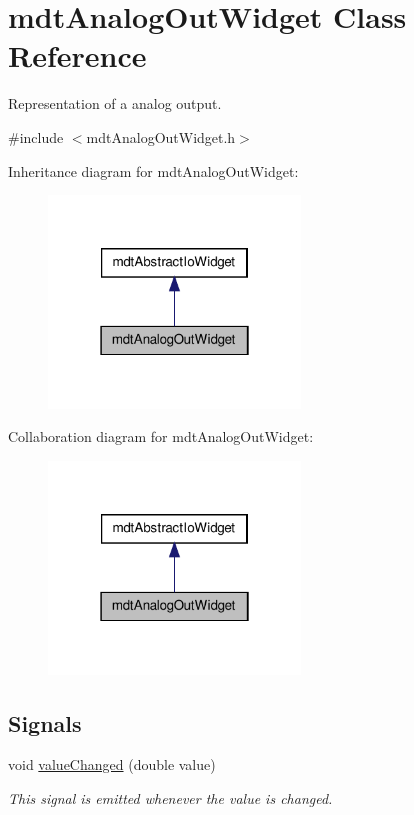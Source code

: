 \hypertarget{classmdt_analog_out_widget}{
\section{mdtAnalogOutWidget Class Reference}
\label{classmdt_analog_out_widget}
}


Representation of a analog output.  




{\ttfamily \#include $<$mdtAnalogOutWidget.h$>$}



Inheritance diagram for mdtAnalogOutWidget:
\nopagebreak
\begin{figure}[H]
\begin{center}
\leavevmode
\includegraphics[width=190pt]{classmdt_analog_out_widget__inherit__graph}
\end{center}
\end{figure}


Collaboration diagram for mdtAnalogOutWidget:
\nopagebreak
\begin{figure}[H]
\begin{center}
\leavevmode
\includegraphics[width=190pt]{classmdt_analog_out_widget__coll__graph}
\end{center}
\end{figure}
\subsection*{Signals}
\begin{DoxyCompactItemize}
\item 
\hypertarget{classmdt_analog_out_widget_a9a2e8294dfff97f4995376d31845ea4f}{
void \hyperlink{classmdt_analog_out_widget_a9a2e8294dfff97f4995376d31845ea4f}{valueChanged} (double value)}
\label{classmdt_analog_out_widget_a9a2e8294dfff97f4995376d31845ea4f}

\begin{DoxyCompactList}\small\item\em This signal is emitted whenever the value is changed. \end{DoxyCompactList}\end{DoxyCompactItemize}
